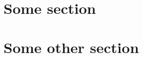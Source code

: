 \documentclass[12pt]{article}
\begin{document}
\section{Some section}



\section{Some other section}


\end{document}
